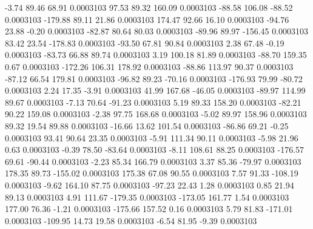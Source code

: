        -3.74       89.46       68.91     0.0003103
       97.53       89.32      160.09     0.0003103
      -88.58      106.08      -88.52     0.0003103
     -179.88       89.11       21.86     0.0003103
      174.47       92.66       16.10     0.0003103
      -94.76       23.88       -0.20     0.0003103
      -82.87       80.64       80.03     0.0003103
      -89.96       89.97     -156.45     0.0003103
       83.42       23.54     -178.83     0.0003103
      -93.50       67.81       90.84     0.0003103
        2.38       67.48       -0.19     0.0003103
      -83.73       66.88       89.74     0.0003103
        3.19      100.18       81.89     0.0003103
      -88.70      159.35        0.67     0.0003103
     -172.26      106.31      178.92     0.0003103
      -88.86      113.97       90.37     0.0003103
      -87.12       66.54      179.81     0.0003103
      -96.82       89.23      -70.16     0.0003103
     -176.93       79.99      -80.72     0.0003103
        2.24       17.35       -3.91     0.0003103
       41.99      167.68      -46.05     0.0003103
      -89.97      114.99       89.67     0.0003103
       -7.13       70.64      -91.23     0.0003103
        5.19       89.33      158.20     0.0003103
      -82.21       90.22      159.08     0.0003103
       -2.38       97.75      168.68     0.0003103
       -5.02       89.97      158.96     0.0003103
       89.32       19.54       89.88     0.0003103
      -16.66       13.62      101.54     0.0003103
      -86.86       69.21       -0.25     0.0003103
       93.41       90.64       23.35     0.0003103
       -5.91      111.34       90.11     0.0003103
       -5.98       21.96        0.63     0.0003103
       -0.39       78.50      -83.64     0.0003103
       -8.11      108.61       88.25     0.0003103
     -176.57       69.61      -90.44     0.0003103
       -2.23       85.34      166.79     0.0003103
        3.37       85.36      -79.97     0.0003103
      178.35       89.73     -155.02     0.0003103
      175.38       67.08       90.55     0.0003103
        7.57       91.33     -108.19     0.0003103
       -9.62      164.10       87.75     0.0003103
      -97.23       22.43        1.28     0.0003103
        0.85       21.94       89.13     0.0003103
        4.91      111.67     -179.35     0.0003103
     -173.05      161.77        1.54     0.0003103
      177.00       76.36       -1.21     0.0003103
     -175.66      157.52        0.16     0.0003103
        5.79       81.83     -171.01     0.0003103
     -109.95       14.73       19.58     0.0003103
       -6.54       81.95       -9.39     0.0003103
